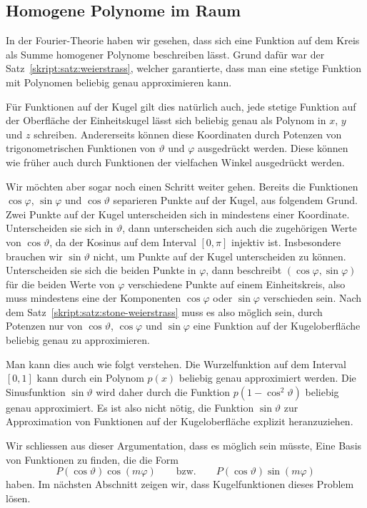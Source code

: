\subsection{Homogene Polynome im Raum}
In der Fourier-Theorie haben wir gesehen, dass sich eine Funktion
auf dem Kreis als Summe homogener Polynome beschreiben lässt.
Grund dafür war der Satz~\ref{skript:satz:weierstrass}, welcher
garantierte, dass man eine stetige Funktion mit Polynomen beliebig genau
approximieren kann.

Für Funktionen auf der Kugel gilt dies natürlich auch, jede stetige
Funktion auf der Oberfläche der Einheitskugel lässt sich beliebig
genau als Polynom in $x$, $y$ und $z$ schreiben.
Andererseits können diese Koordinaten durch Potenzen von trigonometrischen
Funktionen von $\vartheta$ und $\varphi$ ausgedrückt werden.
Diese können wie früher auch durch Funktionen der vielfachen Winkel
ausgedrückt werden.

Wir möchten aber sogar noch einen Schritt weiter gehen.
Bereits die Funktionen $\cos\varphi$, $\sin\varphi$ und $\cos\vartheta$
separieren Punkte auf der Kugel, aus folgendem Grund.
Zwei Punkte auf der Kugel unterscheiden sich in mindestens einer 
Koordinate.
Unterscheiden sie sich in $\vartheta$, dann unterscheiden sich auch
die zugehörigen Werte von $\cos\vartheta$, da der Kosinus auf dem
Interval $[0,\pi]$ injektiv ist.
Insbesondere brauchen wir $\sin\vartheta$ nicht, um Punkte auf der 
Kugel unterscheiden zu können.
Unterscheiden sie sich die beiden Punkte in $\varphi$, dann beschreibt
$(\cos\varphi,\sin\varphi)$ für die beiden Werte von $\varphi$ verschiedene
Punkte auf einem Einheitskreis, also muss mindestens eine der
Komponenten $\cos\varphi$ oder $\sin\varphi$ verschieden sein.
Nach dem Satz~\ref{skript:satz:stone-weierstrass} muss es also 
möglich sein, durch Potenzen nur von $\cos\vartheta$, $\cos\varphi$
und $\sin\varphi$ eine Funktion auf der Kugeloberfläche beliebig genau
zu approximieren.

Man kann dies auch wie folgt verstehen.
Die Wurzelfunktion auf dem Interval $[0,1]$ kann durch ein Polynom $p(x)$
beliebig genau approximiert werden.
Die Sinusfunktion $\sin\vartheta$ wird daher durch die Funktion
$p(1-\cos^2\vartheta)$ beliebig genau approximiert.
Es ist also nicht nötig, die Funktion $\sin\vartheta$ zur Approximation
von Funktionen auf der Kugeloberfläche explizit heranzuziehen.

Wir schliessen aus dieser Argumentation, dass es möglich sein müsste,
Eine Basis von Funktionen zu finden, die die Form
\[
P(\cos\vartheta) \cos(m\varphi)
\qquad
\text{bzw.}
\qquad
P(\cos\vartheta) \sin(m\varphi)
\]
haben.
Im nächsten Abschnitt zeigen wir, dass Kugelfunktionen dieses Problem lösen.

